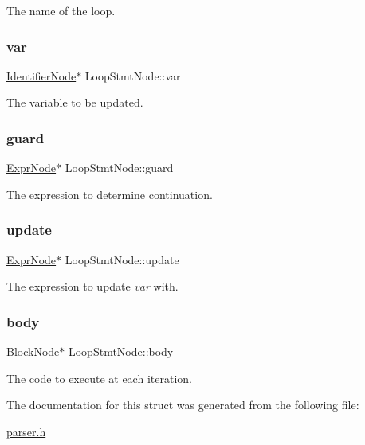The name of the loop. \mbox{\label{struct_loop_stmt_node_afb3820072966231fd1d43eea8ebd9234}} 
\subsubsection{\texorpdfstring{var}{var}}
{\footnotesize\ttfamily \hyperlink{parser_8h_a930727769b8a8eb0d24d474f3aa12a43}{Identifier\+Node}$\ast$ Loop\+Stmt\+Node\+::var}

The variable to be updated. \mbox{\label{struct_loop_stmt_node_a53a86fb7f989cf43f54192b8f3ad6c1a}} 
\subsubsection{\texorpdfstring{guard}{guard}}
{\footnotesize\ttfamily \hyperlink{struct_expr_node}{Expr\+Node}$\ast$ Loop\+Stmt\+Node\+::guard}

The expression to determine continuation. \mbox{\label{struct_loop_stmt_node_a0400ab555fff51b09f79c495af20f37f}} 
\subsubsection{\texorpdfstring{update}{update}}
{\footnotesize\ttfamily \hyperlink{struct_expr_node}{Expr\+Node}$\ast$ Loop\+Stmt\+Node\+::update}

The expression to update {\itshape var} with. \mbox{\label{struct_loop_stmt_node_a6844fd9206ed5d6b4fd48fc1365969aa}} 
\subsubsection{\texorpdfstring{body}{body}}
{\footnotesize\ttfamily \hyperlink{struct_block_node}{Block\+Node}$\ast$ Loop\+Stmt\+Node\+::body}

The code to execute at each iteration. 

The documentation for this struct was generated from the following file\+:\begin{DoxyCompactItemize}
\item 
\hyperlink{parser_8h}{parser.\+h}\end{DoxyCompactItemize}
